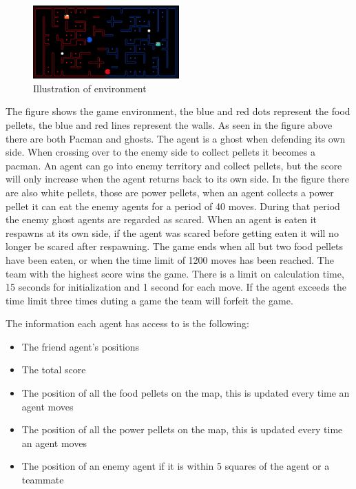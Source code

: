 \documentclass[a4paper,12pt]{article}
\begin{document}
\begin{figure}[!htbp]
  \centering
  \includegraphics[width=0.5\textwidth]{./figuresA4/pacman_illustration.png}
  \caption{Illustration of environment}
  \label{fig:drag_force}
\end{figure}

The figure shows the game environment, the blue and red dots represent the food pellets, the blue and red lines represent the walls. 
As seen in the figure above there are both Pacman and ghosts. The agent is a ghost when defending its own side. When crossing over to the enemy side to collect pellets it becomes a pacman.
An agent can go into enemy territory and collect pellets, but the score will only increase when the agent returns back to its own side. In the figure there are also white pellets, 
those are power pellets, when an agent collects a power pellet it can eat the enemy agents for a period of 40 moves. During that period the enemy ghost agents are regarded as scared.
When an agent is eaten it respawns at its own side, if the agent was scared before getting eaten it will no longer be scared after respawning.
The game ends when all but two food pellets have been eaten, or when the time limit of 1200 moves has been reached. The team with the highest score wins the game.
There is a limit on calculation time, 15 seconds for initialization and 1 second for each move. If the agent exceeds the time limit three times duting a game the team will forfeit the game.

The information each agent has access to is the following:
\begin{itemize}
  \item The friend agent's positions
  \item The total score
  \item The position of all the food pellets on the map, this is updated every time an agent moves
  \item The position of all the power pellets on the map, this is updated every time an agent moves
  \item The position of an enemy agent if it is within 5 squares of the agent or a teammate
\end{itemize}
\end{document}
